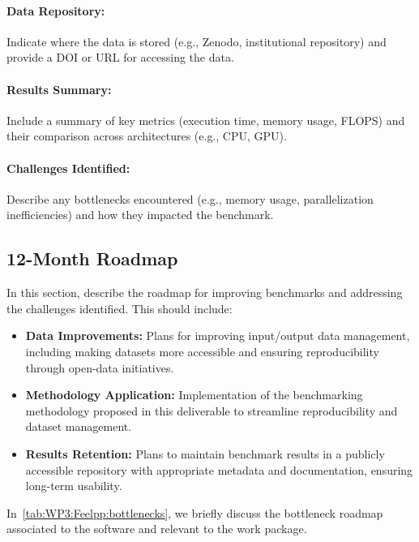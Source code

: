 \paragraph{Data Repository:} Indicate where the data is stored (e.g., Zenodo, institutional repository) and provide a DOI or URL for accessing the data.

\paragraph{Results Summary:} Include a summary of key metrics (execution time, memory usage, FLOPS) and their comparison across architectures (e.g., CPU, GPU).

\paragraph{Challenges Identified:} Describe any bottlenecks encountered (e.g., memory usage, parallelization inefficiencies) and how they impacted the benchmark.

\subsection{12-Month Roadmap}
\label{sec:WP3:Feelpp:roadmap}

In this section, describe the roadmap for improving benchmarks and addressing the challenges identified. This should include:
\begin{itemize}
    \item \textbf{Data Improvements:} Plans for improving input/output data management, including making datasets more accessible and ensuring reproducibility through open-data initiatives.
    \item \textbf{Methodology Application:} Implementation of the benchmarking methodology proposed in this deliverable to streamline reproducibility and dataset management.
    \item \textbf{Results Retention:} Plans to maintain benchmark results in a publicly accessible repository with appropriate metadata and documentation, ensuring long-term usability.
\end{itemize}

In~\cref{tab:WP3:Feelpp:bottlenecks}, we briefly discuss the bottleneck roadmap associated to the software and relevant to the work package.

